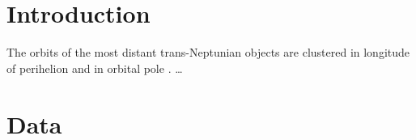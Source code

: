 \documentclass[twocolumn,linenumbers]{aastex631}
\begin{document}
\section{Introduction}\label{sec:intro}
The orbits of the most distant trans-Neptunian objects are clustered in longitude of perihelion and in orbital pole \citep{Trujillo2014,Batygin2016}. \dots

\section{Data}\label{sec:data}
\end{document}
